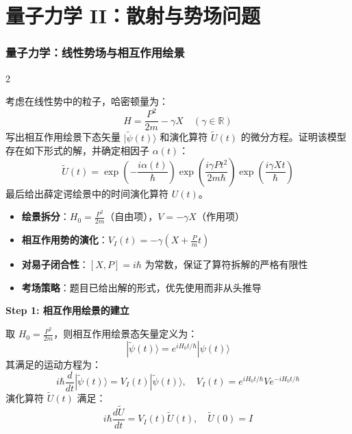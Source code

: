 \part{量子力学 II：散射与势场问题}\label{part:qm2}\setpartcolor{\value{part}}

\newpage
\section{量子力学：线性势场与相互作用绘景}

\begin{multicols}{2}

\begin{modelbox}[题目：线性势中的粒子演化]
考虑在线性势中的粒子，哈密顿量为：
\[
H = \frac{P^2}{2m} - \gamma X \quad (\gamma \in \mathbb{R})
\]
写出相互作用绘景下态矢量 $|\tilde{\psi}(t)\rangle$ 和演化算符 $\tilde{U}(t)$ 的微分方程。证明该模型存在如下形式的解，并确定相因子 $\alpha(t)$：
\[
\tilde{U}(t) = \exp\left( -\frac{i\alpha(t)}{\hbar} \right) \exp\left( \frac{i\gamma P t^2}{2m\hbar} \right) \exp\left( \frac{i\gamma X t}{\hbar} \right)
\]
最后给出薛定谔绘景中的时间演化算符 $U(t)$。
\end{modelbox}

\begin{tipbox}[考点快速分析]
\begin{itemize}
    \item \textbf{绘景拆分}：$H_0 = \frac{P^2}{2m}$（自由项），$V = -\gamma X$（作用项）
    \item \textbf{相互作用势的演化}：$V_I(t) = -\gamma (X + \frac{P}{m}t)$
    \item \textbf{对易子闭合性}：$[X, P] = i\hbar$ 为常数，保证了算符拆解的严格有限性
    \item \textbf{考场策略}：题目已给出解的形式，优先使用而非从头推导
\end{itemize}
\end{tipbox}

\begin{derivationbox}[标准解题过程]
\textbf{Step 1: 相互作用绘景的建立}

取 $H_0 = \frac{P^2}{2m}$，则相互作用绘景态矢量定义为：
\[
|\tilde{\psi}(t)\rangle = e^{iH_0 t/\hbar} |\psi(t)\rangle
\]
其满足的运动方程为：
\[
i\hbar \frac{d}{dt}|\tilde{\psi}(t)\rangle = V_I(t) |\tilde{\psi}(t)\rangle, \quad V_I(t) = e^{iH_0 t/\hbar} V e^{-iH_0 t/\hbar}
\]
演化算符 $\tilde{U}(t)$ 满足：
\[
i\hbar \frac{d\tilde{U}}{dt} = V_I(t) \tilde{U}(t), \quad \tilde{U}(0) = I
\]


\end{derivationbox}
\end{multicols}
